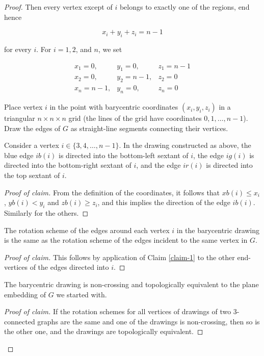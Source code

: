 \begin{proof}
	Then every vertex except of $i$ belongs to exactly one of the regions, end hence
	
	$$
	x_i + y_i + z_i = n - 1
	$$
	
	for every $i$. For $i = 1, 2$, and $n$, we set
	
	$$
	\begin{array}{lll}
		x_1 = 0,   &y_1 = 0,   &z_1 = n - 1\\
		x_2 = 0,   &y_2 = n-1, &z_2 = 0\\
		x_n = n-1, &y_n = 0,   & z_n = 0 	
	\end{array}
	$$
	
	Place vertex $i$ in the point with barycentric coordinates $(x_i , y_i , z_i)$ in a triangular $n \times n \times n$ grid (the lines of the grid have coordinates $0, 1, \dots, n - 1$). Draw the edges of $G$ as straight-line segments
	connecting their vertices.
	
	\begin{claim}
		Consider a vertex $i \in \{3, 4, \dots, n - 1\}$. In the drawing constructed as above, the blue edge $ib(i)$ is directed into the bottom-left sextant of $i$, the edge $ig(i)$ is directed into the bottom-right sextant of $i$, and the edge $ir(i)$ is directed into the top sextant of $i$.
		\label{claim-1}
	\end{claim}
	
	\begin{proof}[Proof of claim]
		From the definition of the coordinates, it follows that $xb(i) \leq x_i$, $yb(i) < y_i$ and $zb(i) \geq z_i$, and this implies the direction of the edge $ib(i)$. Similarly for the others.
	\end{proof}
	
	\begin{claim}
		The rotation scheme of the edges around each vertex $i$ in the barycentric drawing is the same as the rotation scheme of the edges incident to the same vertex in $G$.
	\end{claim}
	
	\begin{proof}[Proof of claim]
		This follows by application of Claim \ref{claim-1} to the other end-vertices of the edges directed into $i$.
	\end{proof}
	
	\begin{claim}
		The barycentric drawing is non-crossing and topologically equivalent to the plane embedding of $G$ we started with.
	\end{claim}
	
	\begin{proof}[Proof of claim]
		If the rotation schemes for all vertices of drawings of two 3-connected graphs are the same and one of the drawings is non-crossing, then so is the other one, and the drawings are topologically equivalent.
	\end{proof}
\end{proof}

